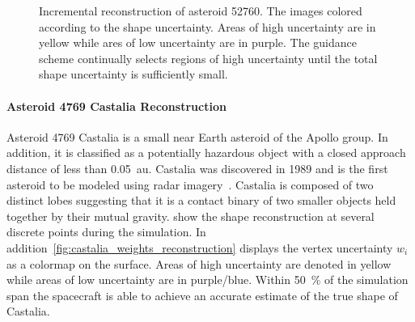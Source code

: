 \documentclass[smallextended]{svjour3}       %
\begin{document}
\begin{figure}[htbp]
    \centering


    \caption[Asteroid 52760 shape reconstruction with uncertainty]{Incremental reconstruction of asteroid 52760. The images colored according to the shape uncertainty. Areas of high uncertainty are in yellow while ares of low uncertainty are in purple.
    The guidance scheme continually selects regions of high uncertainty until the total shape uncertainty is sufficiently small.~\label{fig:52760_weights_reconstruction}}
\end{figure}

\paragraph{Asteroid 4769 Castalia Reconstruction}

Asteroid 4769 Castalia is a small near Earth asteroid of the Apollo group.
In addition, it is classified as a potentially hazardous object with a closed approach distance of less than \SI{0.05}{\astronomicalunit}.
Castalia was discovered in \num{1989} and is the first asteroid to be modeled using radar imagery~\cite{hudson1994}.
Castalia is composed of two distinct lobes suggesting that it is a contact binary of two smaller objects held together by their mutual gravity.
 show the shape reconstruction at several discrete points during the simulation.
In addition~\cref{fig:castalia_weights_reconstruction} displays the vertex uncertainty \( w_i \) as a colormap on the surface. 
Areas of high uncertainty are denoted in yellow while areas of low uncertainty are in purple/blue.
Within \SI{50}{\percent} of the simulation span the spacecraft is able to achieve an accurate estimate of the true shape of Castalia.
\end{document}
